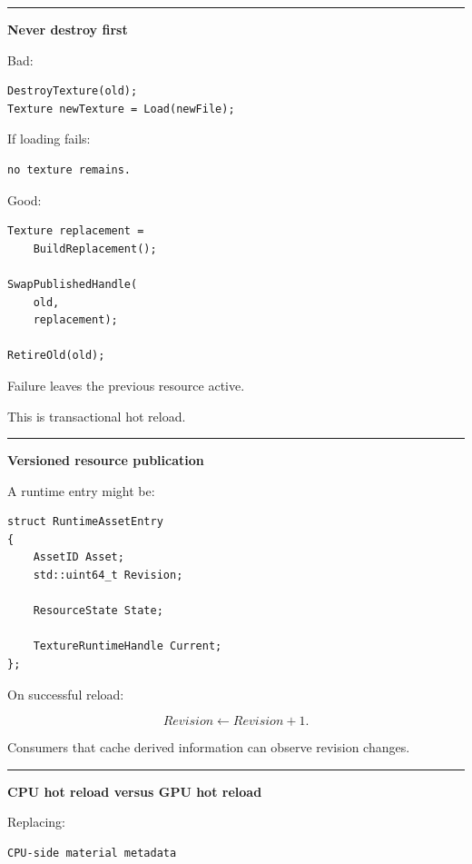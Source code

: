 \begin{center}\rule{0.5\linewidth}{0.5pt}\end{center}

\textbf{Never destroy first}

Bad:

\begin{verbatim}
DestroyTexture(old);
Texture newTexture = Load(newFile);
\end{verbatim}

If loading fails:

\begin{verbatim}
no texture remains.
\end{verbatim}

Good:

\begin{verbatim}
Texture replacement =
    BuildReplacement();

SwapPublishedHandle(
    old,
    replacement);

RetireOld(old);
\end{verbatim}

Failure leaves the previous resource active.

This is transactional hot reload.

\begin{center}\rule{0.5\linewidth}{0.5pt}\end{center}

\textbf{Versioned resource publication}

A runtime entry might be:

\begin{verbatim}
struct RuntimeAssetEntry
{
    AssetID Asset;
    std::uint64_t Revision;

    ResourceState State;

    TextureRuntimeHandle Current;
};
\end{verbatim}

On successful reload:

\[
Revision\leftarrow Revision+1.
\]

Consumers that cache derived information can observe revision changes.

\begin{center}\rule{0.5\linewidth}{0.5pt}\end{center}

\textbf{CPU hot reload versus GPU hot reload}

Replacing:

\begin{verbatim}
CPU-side material metadata
\end{verbatim}

